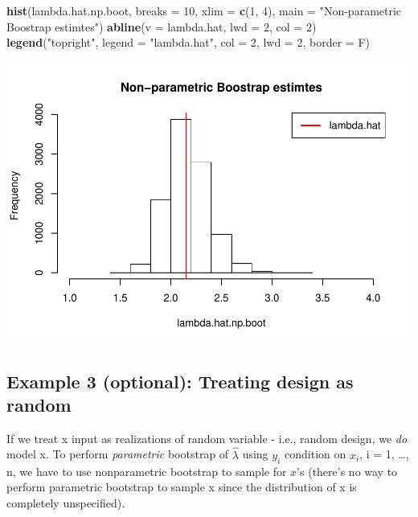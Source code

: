 \documentclass[]{article}
\newenvironment{Shaded}{\begin{snugshade}}{\end{snugshade}}
\newcommand{\KeywordTok}[1]{\textcolor[rgb]{0.13,0.29,0.53}{\textbf{{#1}}}}
\newcommand{\DataTypeTok}[1]{\textcolor[rgb]{0.13,0.29,0.53}{{#1}}}
\newcommand{\DecValTok}[1]{\textcolor[rgb]{0.00,0.00,0.81}{{#1}}}
\newcommand{\StringTok}[1]{\textcolor[rgb]{0.31,0.60,0.02}{{#1}}}
\newcommand{\NormalTok}[1]{{#1}}
\begin{document}
\begin{Shaded}
\begin{Highlighting}[]
\KeywordTok{hist}\NormalTok{(lambda.hat.np.boot, }\DataTypeTok{breaks =} \DecValTok{10}\NormalTok{, }\DataTypeTok{xlim =} \KeywordTok{c}\NormalTok{(}\DecValTok{1}\NormalTok{, }\DecValTok{4}\NormalTok{), }\DataTypeTok{main =} \StringTok{"Non-parametric Boostrap estimtes"}\NormalTok{)}
\KeywordTok{abline}\NormalTok{(}\DataTypeTok{v =} \NormalTok{lambda.hat, }\DataTypeTok{lwd =} \DecValTok{2}\NormalTok{, }\DataTypeTok{col =} \DecValTok{2}\NormalTok{)}
\KeywordTok{legend}\NormalTok{(}\StringTok{"topright"}\NormalTok{, }\DataTypeTok{legend =} \StringTok{"lambda.hat"}\NormalTok{, }\DataTypeTok{col =} \DecValTok{2}\NormalTok{, }\DataTypeTok{lwd =} \DecValTok{2}\NormalTok{, }\DataTypeTok{border =} \NormalTok{F)}
\end{Highlighting}
\end{Shaded}

\includegraphics{Stats406Lab11_files/figure-latex/unnamed-chunk-6-1.pdf}

\subsection{Example 3 (optional): Treating design as
random}\label{example-3-optional-treating-design-as-random}

If we treat x input as realizations of random variable - i.e., random
design, we \emph{do} model x. To perform \emph{parametric} bootstrap of
\(\hat\lambda\) using \(y_i\) condition on \(x_i\), i = 1, \ldots{}, n,
we have to use nonparametric bootstrap to sample for \(x\)'s (there's no
way to perform parametric bootstrap to sample x since the distribution
of x is completely unspecified).
\end{document}
